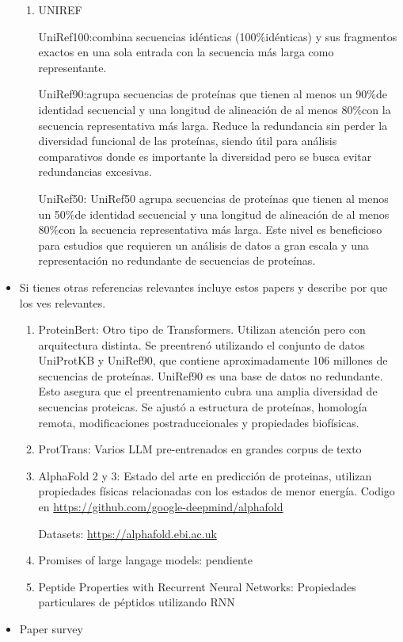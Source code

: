 \documentclass[11pt, twoside]{report}
\begin{document}
\begin{itemize}
\begin{enumerate}
        \item UNIREF
        
        UniRef100:combina secuencias idénticas (100$\% $idénticas) y sus fragmentos exactos en una sola entrada con la secuencia más larga como representante.
    
        UniRef90:agrupa secuencias de proteínas que tienen al menos un 90$\% $de identidad secuencial y una longitud de alineación de al menos 80$\% $con la secuencia representativa más larga. Reduce la redundancia sin perder la diversidad funcional de las proteínas, siendo útil para análisis comparativos donde es importante la diversidad pero se busca evitar redundancias excesivas.
        
        UniRef50: UniRef50 agrupa secuencias de proteínas que tienen al menos un 50$\% $de identidad secuencial y una longitud de alineación de al menos 80$\% $con la secuencia representativa más larga.  Este nivel es beneficioso para estudios que requieren un análisis de datos a gran escala y una representación no redundante de secuencias de proteínas.
    \end{enumerate}

    \item Si tienes otras referencias relevantes incluye estos papers y describe por que los ves relevantes.
    
    \begin{enumerate}
        \item ProteinBert: Otro tipo de Transformers. Utilizan atención pero con arquitectura distinta. Se preentrenó utilizando el conjunto de datos UniProtKB y UniRef90, que contiene aproximadamente 106 millones de secuencias de proteínas. UniRef90 es una base de datos no redundante. Esto asegura que el preentrenamiento cubra una amplia diversidad de secuencias proteicas. Se ajustó a estructura de proteínas, homología remota, modificaciones postraduccionales y propiedades biofísicas.
    
        \item ProtTrans: Varios LLM pre-entrenados en grandes corpus de texto
    
        \item AlphaFold 2 y 3: Estado del arte en predicción de proteinas, utilizan propiedades físicas relacionadas con los estados de menor energía. Codigo en \url{https://github.com/google-deepmind/alphafold}
        
        Datasets: \url{https://alphafold.ebi.ac.uk}
        \item Promises of large langage models: pendiente
        \item Peptide Properties with Recurrent Neural Networks: Propiedades particulares de péptidos utilizando RNN
    \end{enumerate}
    \item Paper survey
    


\end{itemize}
\end{document}
